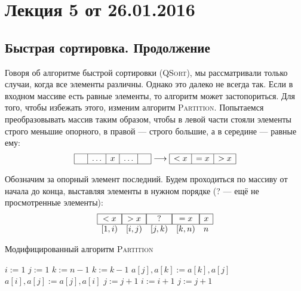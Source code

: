 



\section*{Лекция 5 от 26.01.2016}

\subsection*{Быстрая сортировка. Продолжение}
Говоря об алгоритме быстрой сортировки (\textsc{QSort}), мы рассматривали только случаи, когда все элементы различны. Однако это далеко не всегда так. Если в входном массиве есть равные элементы, то алгоритм может застопориться. Для того, чтобы избежать этого, изменим алгоритм \textsc{Partition}. Попытаемся преобразовывать массив таким образом, чтобы в левой части стояли элементы строго меньшие опорного, в правой --- строго большие, а в середине --- равные ему:
\[\begin{array}{|c|c|c|c|c|}
	\hline
	\phantom{x}  & \dots & x & \dots & \phantom{x}  \\
	\hline
\end{array}
\longrightarrow
\begin{array}{|c|c|c|}
    \hline
    <x&=x&>x\\
    \hline
\end{array}\]

Обозначим за опорный элемент последний. Будем проходиться по массиву от начала до конца, выставляя элементы в нужном порядке (? — ещё не просмотренные элементы):
\[\begin{array}{lllll}
    \hline
   	\multicolumn{1}{|c|}{<x} & \multicolumn{1}{|c|}{>x} & \multicolumn{1}{|c|}{  ?  } & \multicolumn{1}{|c|}{=x} & \multicolumn{1}{|c|}{x}\\
    \hline
    [1, i) & [i, j) & [j, k) & [k, n) & n
\end{array}\]

\begin{algorithm}
\caption{Модифицированный алгоритм \textsc{Partition}}
\begin{algorithmic}[1]
\State $i \mathrel{:=} 1$
\State $j \mathrel{:=} 1$
\State $k \mathrel{:=} n - 1$
		\State $k \mathrel{:=} k - 1$
		\State $a[j], a[k] \mathrel{:=} a[k], a[j]$
	\Else {}
		\State $a[i], a[j] \mathrel{:=} a[j], a[i]$
		\State $j \mathrel{:=} j + 1$
		\State $i \mathrel{:=} i + 1$
	\Else
		\State $j \mathrel{:=} j + 1$
	\EndIf
	\EndIf
\EndWhile
\EndFunction
\end{algorithmic}
\end{algorithm}

